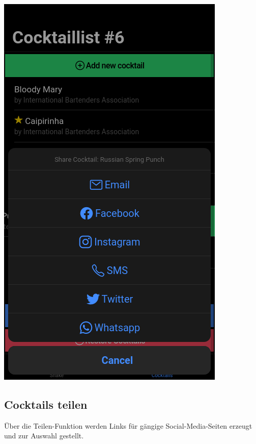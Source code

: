 \documentclass[a4paper, 10pt]{article}
\begin{document}
\begin{multicols}{4}
    \begin{center}
        \includegraphics[width=.8\linewidth]{CocktailList-4.png}
    \end{center}
    \columnbreak
    \subsection{Cocktails teilen}
    Über die Teilen-Funktion werden Links für gängige Social-Media-Seiten erzeugt und zur Auswahl gestellt.
\end{multicols}
\end{document}
